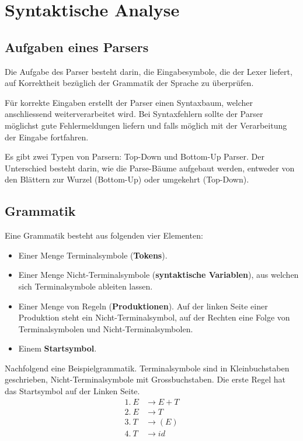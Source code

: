 \section{Syntaktische Analyse}


\subsection{Aufgaben eines Parsers}

Die Aufgabe des Parser besteht darin, die Eingabesymbole, die der Lexer liefert,
auf Korrektheit bezüglich der Grammatik der Sprache zu überprüfen.

Für korrekte Eingaben erstellt der Parser einen Syntaxbaum, welcher
anschliessend weiterverarbeitet wird. Bei Syntaxfehlern sollte der Parser
möglichst gute Fehlermeldungen liefern und falls möglich mit der Verarbeitung
der Eingabe fortfahren.

Es gibt zwei Typen von Parsern: Top-Down und Bottom-Up Parser. Der Unterschied
besteht darin, wie die Parse-Bäume aufgebaut werden, entweder von den Blättern
zur Wurzel (Bottom-Up) oder umgekehrt (Top-Down).


\subsection{Grammatik}

Eine Grammatik besteht aus folgenden vier Elementen:

\begin{itemize}
	\item Einer Menge Terminalsymbole (\textbf{Tokens}).
	\item Einer Menge Nicht-Terminalsymbole (\textbf{syntaktische Variablen}), aus
		welchen sich Terminalsymbole ableiten lassen.
	\item Einer Menge von Regeln (\textbf{Produktionen}). Auf der linken Seite
		einer Produktion steht ein Nicht-Terminalsymbol, auf der Rechten eine Folge
		von Terminalsymbolen und Nicht-Terminalsymbolen.
	\item Einem \textbf{Startsymbol}.
\end{itemize}

Nachfolgend eine Beispielgrammatik. Terminalsymbole sind in Kleinbuchstaben
geschrieben, Nicht-Terminalsymbole mit Grossbuchstaben. Die erste Regel hat das
Startsymbol auf der Linken Seite.
%
\begin{align*}
	1.~E &\rightarrow E + T \\
	2.~E &\rightarrow T \\
	3.~T &\rightarrow (E) \\
	4.~T &\rightarrow id
\end{align*}

